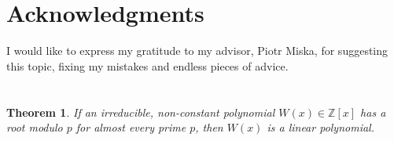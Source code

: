 \documentclass[preprint,12pt]{elsarticle}
\newcommand{\Z}{\mathbb{Z}}
\newtheorem{theorem}{Theorem}
\begin{document}
\section{Acknowledgments}




I would like to express my gratitude to my advisor, Piotr Miska, for suggesting this topic, fixing my mistakes and endless pieces of advice. 




\appendix
\section{}

\begin{theorem}
    If an irreducible, non-constant polynomial $W(x)\in\Z[x]$ has a root modulo $p$ for almost every prime $p$, then $W(x)$ is a linear polynomial.
\end{theorem}
\end{document}
